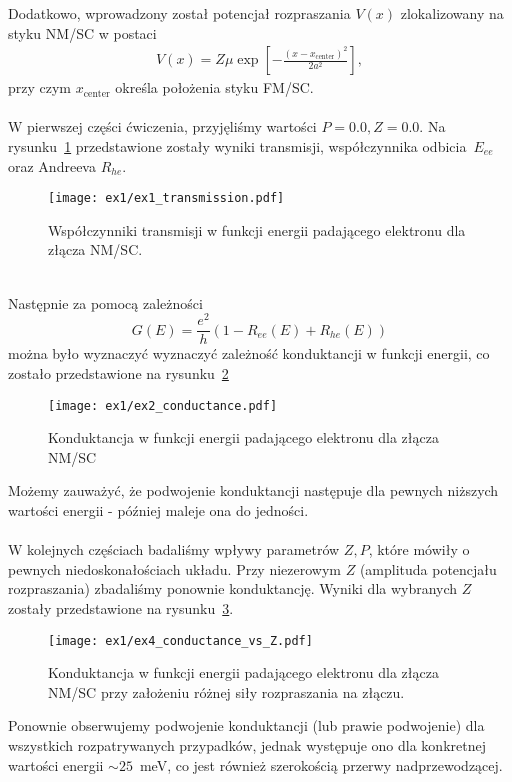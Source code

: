 \documentclass{article}
\begin{document}
Dodatkowo, wprowadzony został potencjał rozpraszania $V(x)$ zlokalizowany na styku NM/SC w postaci
\begin{gather}
    V(x) = Z\mu \exp\left[-\frac{(x-x_{\text{center}})^2}{2a^2}\right],
\end{gather}
przy czym $x_{\text{center}}$ określa położenia styku FM/SC.\\
\\
W pierwszej części ćwiczenia, przyjęliśmy wartości $P=0.0, Z=0.0$.
Na rysunku~\ref{fig:ex1-transmission} przedstawione zostały wyniki transmisji, współczynnika odbicia~$E_{ee}$ oraz Andreeva $R_{he}$.\\
\begin{figure}[htp!]
    \centering
    \texttt{[image: ex1/ex1\_transmission.pdf]}
    \caption{Współczynniki transmisji w funkcji energii padającego elektronu dla złącza NM/SC.}
    \label{fig:ex1-transmission}
\end{figure}
\\
Następnie za pomocą zależności
\begin{equation}
    G(E) = \frac{e^2}{h}\left(1 - R_{ee}(E) + R_{he}(E)\right)
\end{equation}
można było wyznaczyć wyznaczyć zależność konduktancji w funkcji energii, co zostało przedstawione na rysunku~\ref{fig:ex1-conductance}
\begin{figure}[htp!]
    \centering
    \texttt{[image: ex1/ex2\_conductance.pdf]}
    \caption{Konduktancja w funkcji energii padającego elektronu dla złącza NM/SC}
    \label{fig:ex1-conductance}
\end{figure}
Możemy zauważyć, że podwojenie konduktancji następuje dla pewnych niższych wartości energii - później maleje ona do jedności.\\
\\
W kolejnych częściach badaliśmy wpływy parametrów $Z, P$, które mówiły o pewnych niedoskonałościach układu.
Przy niezerowym $Z$ (amplituda potencjału rozpraszania) zbadaliśmy ponownie konduktancję.
Wyniki dla wybranych $Z$ zostały przedstawione na rysunku~\ref{fig:ex1-conductance_z}.
\begin{figure}[htp!]
    \centering
    \texttt{[image: ex1/ex4\_conductance\_vs\_Z.pdf]}
    \caption{Konduktancja w funkcji energii padającego elektronu dla złącza NM/SC przy założeniu różnej siły
rozpraszania na złączu.}
    \label{fig:ex1-conductance_z}
\end{figure}
Ponownie obserwujemy podwojenie konduktancji (lub prawie podwojenie) dla wszystkich rozpatrywanych przypadków, jednak występuje ono dla konkretnej wartości energii $\sim 25$~meV, co jest również szerokością przerwy nadprzewodzącej.\\
\end{document}
